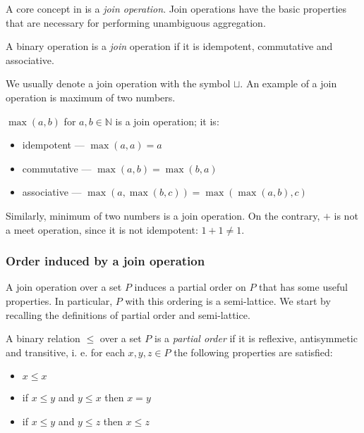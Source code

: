 A core concept in \datalogra is a \emph{join operation}. Join operations have the basic properties that are necessary for performing unambiguous aggregation.

\begin{defn}
A binary operation is a \emph{join} operation if it is idempotent, commutative and associative. 
\end{defn}

We usually denote a join operation with the symbol $\sqcup$.
An example of a join operation is maximum of two numbers.

\begin{exmp}
$\max(a, b)$ for $a, b \in \mathbb{N}$ is a join operation; it is:
\begin{itemize}
\item idempotent --- $\max(a, a) = a$
\item commutative --- $\max(a, b) = \max(b, a)$
\item associative --- $\max(a, \max(b, c)) = \max(\max(a, b), c)$
\end{itemize}

Similarly, minimum of two numbers is a join operation. On the contrary, $+$ is not a meet operation, since it is not idempotent: $1+1 \ne 1$.
\end{exmp}

\subsubsection{Order induced by a join operation}

A join operation over a set $P$ induces a partial order on $P$ that has some useful properties. In particular, $P$ with this ordering is a semi-lattice. We start by recalling the definitions of partial order and semi-lattice.

\begin{defn}
A binary relation $\le$ over a set $P$ is a \emph{partial order} if it is reflexive, antisymmetic and transitive, i. e. for each $x, y, z \in P$ the following properties are satisfied:
\begin{itemize}
\item $x \le x$
\item if $x \le y$ and $y \le x$ then $x = y$
\item if $x \le y$ and $y \le z$ then $x \le z$
\end{itemize}
\end{defn}

